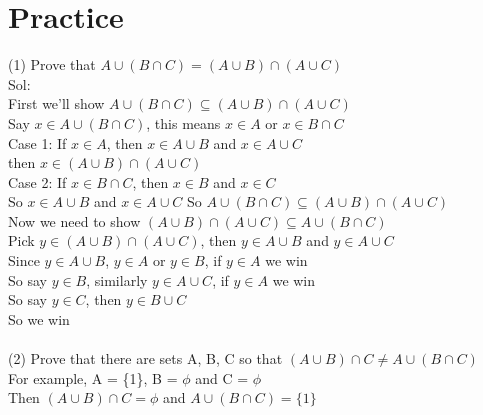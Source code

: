 \documentclass{article}
\begin{document}
 \section{Practice}
 (1) Prove that $A \cup (B \cap C) = (A\cup B) \cap (A\cup C)$ \\
 Sol: \\
 First we'll show $A \cup (B \cap C) \subseteq (A\cup B) \cap (A\cup C)$\\
 Say $x \in A \cup (B \cap C)$, this means $x \in A$ or $x \in B \cap C$\\
 Case 1: If $x \in A$, then $x \in A \cup B$ and  $x \in A \cup C$\\
 then $x \in (A\cup B) \cap (A\cup C)$\\
 Case 2: If $x \in B \cap C$, then $x \in B$ and $x\in C$\\
 So $x \in A \cup B$ and $x \in A \cup C$
 So $A \cup (B \cap C) \subseteq (A\cup B) \cap (A\cup C)$\\
 Now we need to show $(A\cup B) \cap (A\cup C) \subseteq A \cup (B \cap C)$\\
 Pick $y \in (A\cup B) \cap (A\cup C)$, then $y \in A \cup B$ and $y \in A \cup C$\\
 Since $y \in A \cup B$, $y \in A$ or $y \in B$, if $y \in A$ we win\\
 So say $y \in B$, similarly $y \in A \cup C$, if $y \in A$ we win\\
 So say $y \in C$, then $y \in B\cup C$\\
 So we win\\
 \\
 (2) Prove that there are sets A, B, C so that $(A\cup B)\cap C \neq A\cup (B\cap C)$\\
 For example, A = \{1\}, B = $\phi$ and C = $\phi$\\
 Then $(A\cup B)\cap C = \phi$ and $A\cup (B\cap C)= \{1\}$\\
\end{document}
